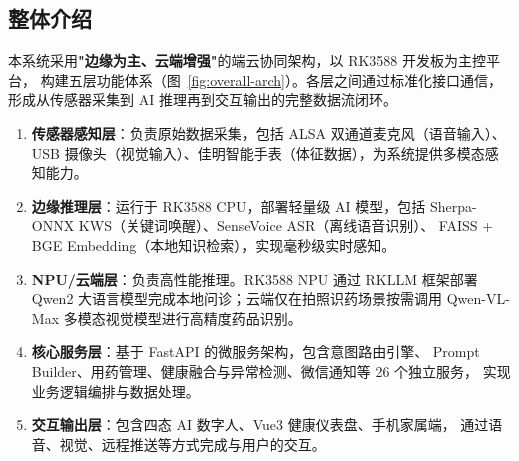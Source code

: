 \documentclass[12pt, a4paper]{ctexart}
\begin{document}
\subsection{整体介绍}

本系统采用\textbf{"边缘为主、云端增强"}的端云协同架构，以 RK3588 开发板为主控平台，
构建五层功能体系（图~\ref{fig:overall-arch}）。各层之间通过标准化接口通信，
形成从传感器采集到 AI 推理再到交互输出的完整数据流闭环。

\begin{enumerate}[leftmargin=2em, itemsep=2pt]
  \item \textbf{传感器感知层}：负责原始数据采集，包括 ALSA 双通道麦克风（语音输入）、
    USB 摄像头（视觉输入）、佳明智能手表（体征数据），为系统提供多模态感知能力。

  \item \textbf{边缘推理层}：运行于 RK3588 CPU，部署轻量级 AI 模型，包括
    Sherpa-ONNX KWS（关键词唤醒）、SenseVoice ASR（离线语音识别）、
    FAISS + BGE Embedding（本地知识检索），实现毫秒级实时感知。

  \item \textbf{NPU/云端层}：负责高性能推理。RK3588 NPU 通过 RKLLM 框架部署
    Qwen2 大语言模型完成本地问诊；云端仅在拍照识药场景按需调用 Qwen-VL-Max
    多模态视觉模型进行高精度药品识别。

  \item \textbf{核心服务层}：基于 FastAPI 的微服务架构，包含意图路由引擎、
    Prompt Builder、用药管理、健康融合与异常检测、微信通知等 26 个独立服务，
    实现业务逻辑编排与数据处理。

  \item \textbf{交互输出层}：包含四态 AI 数字人、Vue3 健康仪表盘、手机家属端，
    通过语音、视觉、远程推送等方式完成与用户的交互。
\end{enumerate}
\end{document}
